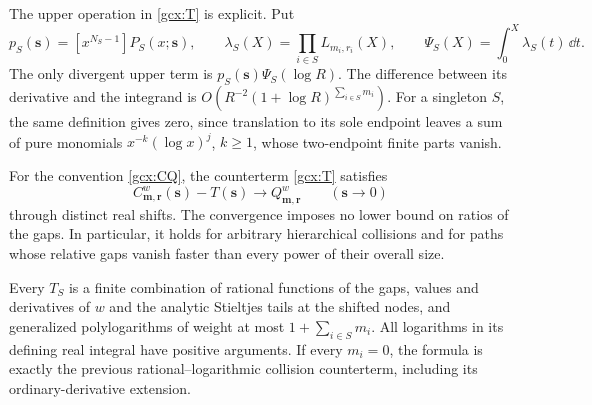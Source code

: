 The upper operation in \eqref{gcx:T} is explicit.  Put
\[
 p_S(\boldsymbol s)=[x^{N_S-1}]P_S(x;\boldsymbol s),\qquad
 \lambda_S(X)=\prod_{i\in S}L_{m_i,r_i}(X),\qquad
 \Psi_S(X)=\int_0^X\lambda_S(t)\,\dd t.
\]
The only divergent upper term is
$p_S(\boldsymbol s)\Psi_S(\log R)$.  The difference between its derivative
and the integrand is $O(R^{-2}(1+\log R)^{\sum_{i\in S}m_i})$.
For a singleton $S$, the same definition gives zero, since translation
to its sole endpoint leaves a sum of pure monomials
$x^{-k}(\log x)^j$, $k\ge1$, whose two-endpoint finite parts vanish.

\begin{theorem}
\label{gcx:main}
For the convention \eqref{gcx:CQ}, the counterterm \eqref{gcx:T} satisfies
\begin{equation}\label{gcx:limit}
 C_{\boldsymbol m,\boldsymbol r}^{w}(\boldsymbol s)
       -T(\boldsymbol s)
       \longrightarrow Q_{\boldsymbol m,\boldsymbol r}^{w}
 \qquad (\boldsymbol s\longrightarrow0)
\end{equation}
through distinct real shifts.  The convergence imposes no lower bound on
ratios of the gaps.  In particular, it holds for arbitrary hierarchical
collisions and for paths whose relative gaps vanish faster than every
power of their overall size.

Every $T_S$ is a finite combination of rational functions of the gaps,
values and derivatives of $w$ and the analytic Stieltjes tails at the
shifted nodes, and generalized polylogarithms of weight at most
$1+\sum_{i\in S}m_i$.  All logarithms in its defining real integral have
positive arguments.  If every $m_i=0$, the formula is exactly the
previous rational--logarithmic collision counterterm, including its
ordinary-derivative extension.
\end{theorem}

